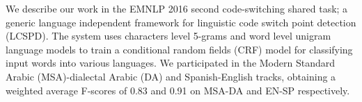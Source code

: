 We describe our work in the EMNLP 2016 second code-switching shared task; a generic language independent framework for linguistic code switch point detection (LCSPD). The system uses characters level 5-grams and word level unigram language models to train a  conditional random fields (CRF) model for classifying  input words into various languages. We participated in the Modern Standard Arabic (MSA)-dialectal Arabic (DA) and Spanish-English tracks, obtaining a weighted average  F-scores of 0.83 and 0.91 on  MSA-DA and EN-SP respectively.
